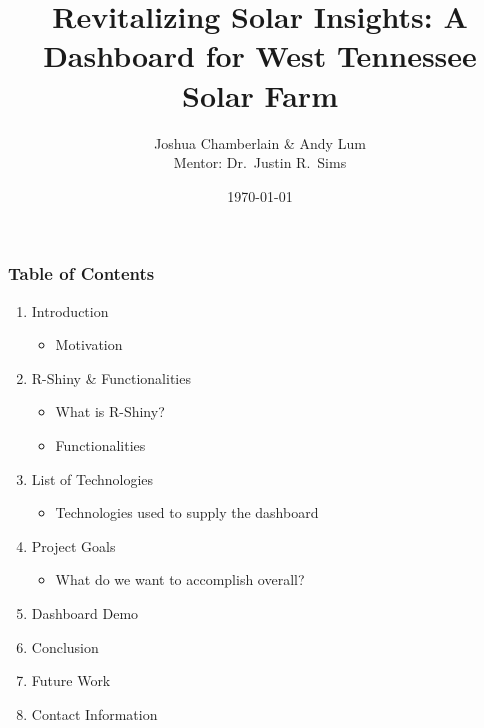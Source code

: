 \documentclass[xcolor=table]{beamer}
\begin{document}
\title{Revitalizing Solar Insights: A Dashboard for West Tennessee Solar Farm}

\author{Joshua Chamberlain \& Andy Lum \\ \vspace{0.1in} Mentor: Dr.~Justin R.~Sims}
\date{\today}



\frame{\titlepage}
\begin{frame}[c] %
%
%
\frametitle{Table of Contents} 
\begin{enumerate}
    \item Introduction
    \begin{itemize}
        \item Motivation
    \end{itemize}

    \item R-Shiny \& Functionalities
    \begin{itemize}
        \item What is R-Shiny?
        \item Functionalities
    \end{itemize}

    \item List of Technologies
    \begin{itemize}
        \item Technologies used to supply the dashboard
    \end{itemize}

    \item Project Goals
    \begin{itemize}
        \item What do we want to accomplish overall?
    \end{itemize}

    \item Dashboard Demo


    \item Conclusion

    \item Future Work

    \item Contact Information
\end{enumerate}
\end{frame}
\end{document}
